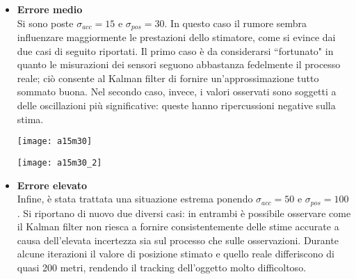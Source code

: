 \begin{itemize}
\item\textbf{Errore medio}\\
Si sono poste $\sigma_{acc} = 15$ e $\sigma_{pos} = 30$. In questo caso il rumore sembra influenzare maggiormente le prestazioni dello stimatore, come si evince dai due casi di seguito riportati. Il primo caso è da considerarsi ``fortunato" in quanto le misurazioni dei sensori seguono abbastanza fedelmente il processo reale; ciò consente al Kalman filter di fornire un'approssimazione tutto sommato buona. Nel secondo caso, invece, i valori osservati sono soggetti a delle oscillazioni più significative: queste hanno ripercussioni negative sulla stima.

\begin{minipage}{\linewidth}
	\centering
	\texttt{[image: a15m30]}
\end{minipage}

\begin{minipage}{\linewidth}
	\centering
	\texttt{[image: a15m30\_2]}	
\end{minipage}


\newpage

\item\textbf{Errore elevato}\\
Infine, è stata trattata una situazione estrema ponendo $\sigma_{acc} = 50$ e $\sigma_{pos} = 100$. Si riportano di nuovo due diversi casi: in entrambi è possibile osservare come il Kalman filter non riesca a fornire consistentemente delle stime accurate a causa dell'elevata incertezza sia sul processo che sulle osservazioni. Durante alcune iterazioni il valore di posizione stimato e quello reale differiscono di quasi 200 metri, rendendo il tracking dell'oggetto molto difficoltoso.


\end{itemize}
